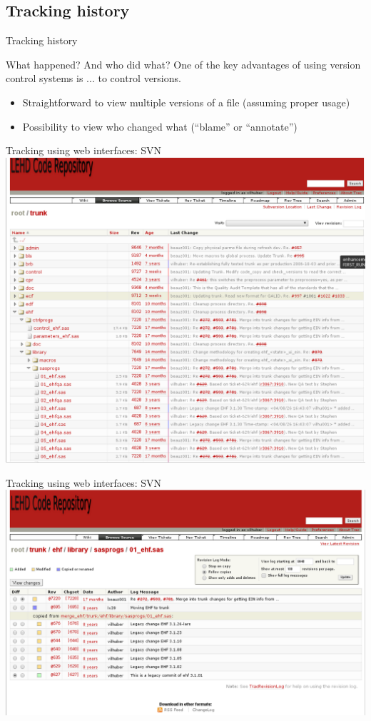 \documentclass[xcolor=table,compress]{beamer}
\begin{document}
\subsection{Tracking history}
\begin{frame}{Tracking history}
\begin{block}{What happened? And who did what?}
One of the key advantages of using version control systems is ... to control versions.
\begin{itemize}
\item Straightforward to view multiple versions of a file (assuming proper usage)
\item Possibility to view who changed what (``blame'' or ``annotate'')
\end{itemize}
\end{block}
\end{frame}

\begin{frame}{Tracking using web interfaces: SVN}
\includegraphics[width=.9\textwidth]{trac-svn-view1.png}
\end{frame}

\begin{frame}{Tracking using web interfaces: SVN}
\includegraphics[width=.9\textwidth]{trac-svn-view2.png}
\end{frame}
\end{document}
